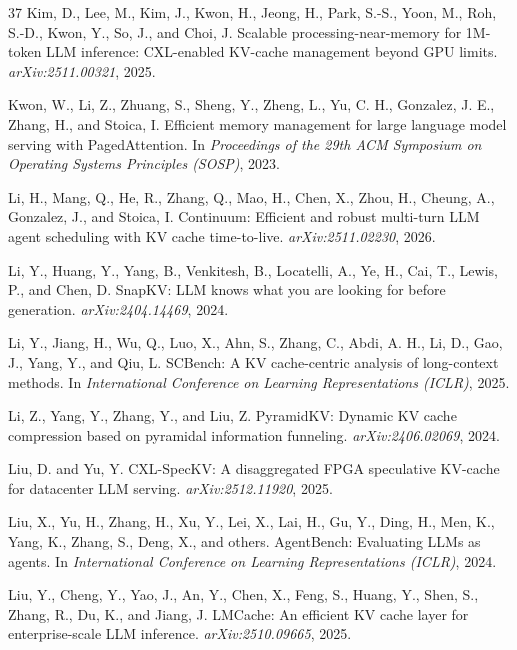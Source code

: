 \documentclass{article}
\begin{document}
\begin{thebibliography}{37}
Kim, D., Lee, M., Kim, J., Kwon, H., Jeong, H., Park, S.-S., Yoon, M.,
  Roh, S.-D., Kwon, Y., So, J., and Choi, J.
\newblock Scalable processing-near-memory for 1M-token LLM inference: CXL-enabled KV-cache management beyond GPU limits.
\newblock \emph{arXiv:2511.00321}, 2025.

Kwon, W., Li, Z., Zhuang, S., Sheng, Y., Zheng, L., Yu, C. H.,
  Gonzalez, J. E., Zhang, H., and Stoica, I.
\newblock Efficient memory management for large language model serving
  with PagedAttention.
\newblock In \emph{Proceedings of the 29th ACM Symposium on Operating
  Systems Principles (SOSP)}, 2023.

Li, H., Mang, Q., He, R., Zhang, Q., Mao, H., Chen, X., Zhou, H.,
  Cheung, A., Gonzalez, J., and Stoica, I.
\newblock Continuum: Efficient and robust multi-turn LLM agent
  scheduling with KV cache time-to-live.
\newblock \emph{arXiv:2511.02230}, 2026.

Li, Y., Huang, Y., Yang, B., Venkitesh, B., Locatelli, A., Ye, H.,
  Cai, T., Lewis, P., and Chen, D.
\newblock SnapKV: LLM knows what you are looking for before generation.
\newblock \emph{arXiv:2404.14469}, 2024.

Li, Y., Jiang, H., Wu, Q., Luo, X., Ahn, S., Zhang, C., Abdi, A. H.,
  Li, D., Gao, J., Yang, Y., and Qiu, L.
\newblock SCBench: A KV cache-centric analysis of long-context methods.
\newblock In \emph{International Conference on Learning Representations
  (ICLR)}, 2025.

Li, Z., Yang, Y., Zhang, Y., and Liu, Z.
\newblock PyramidKV: Dynamic KV cache compression based on pyramidal
  information funneling.
\newblock \emph{arXiv:2406.02069}, 2024.

Liu, D. and Yu, Y.
\newblock CXL-SpecKV: A disaggregated FPGA speculative KV-cache for datacenter LLM serving.
\newblock \emph{arXiv:2512.11920}, 2025.

Liu, X., Yu, H., Zhang, H., Xu, Y., Lei, X., Lai, H., Gu, Y.,
  Ding, H., Men, K., Yang, K., Zhang, S., Deng, X., and others.
\newblock AgentBench: Evaluating LLMs as agents.
\newblock In \emph{International Conference on Learning
  Representations (ICLR)}, 2024.

Liu, Y., Cheng, Y., Yao, J., An, Y., Chen, X., Feng, S., Huang, Y.,
  Shen, S., Zhang, R., Du, K., and Jiang, J.
\newblock LMCache: An efficient KV cache layer for enterprise-scale LLM
  inference.
\newblock \emph{arXiv:2510.09665}, 2025.


\end{thebibliography}
\end{document}
